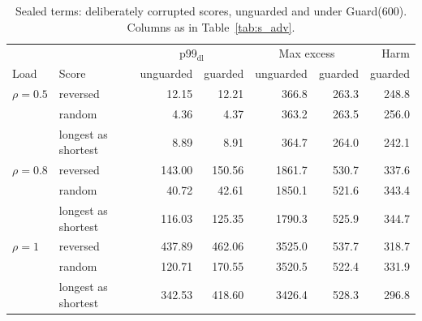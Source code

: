 \documentclass[mathematics,supfile,submit,moreauthors]{Definitions/mdpi}
\newcommand{\sealednum}[1]{#1}
\begin{document}
\begin{table}[htbp]
\centering
\caption{Sealed terms: deliberately corrupted scores, unguarded and under Guard(600). Columns as in Table~\ref{tab:s_adv}.}
\label{tab:adv_sealed}
\small
\setlength{\tabcolsep}{3pt}
\begin{tabular}{llrrrrr}
\toprule
 & & \multicolumn{2}{c}{p99$_{\mathrm{dl}}$} & \multicolumn{2}{c}{Max excess} & Harm \\
Load & Score & unguarded & guarded & unguarded & guarded & guarded \\
\midrule
$\rho = \sealednum{0.5}$ & reversed             & \sealednum{12.15} & \sealednum{12.21} & \sealednum{366.8} & \sealednum{263.3} & \sealednum{248.8} \\
                      & random               & \sealednum{4.36} & \sealednum{4.37} & \sealednum{363.2} & \sealednum{263.5} & \sealednum{256.0} \\
                      & longest as shortest  & \sealednum{8.89} & \sealednum{8.91} & \sealednum{364.7} & \sealednum{264.0} & \sealednum{242.1} \\
$\rho = \sealednum{0.8}$ & reversed             & \sealednum{143.00} & \sealednum{150.56} & \sealednum{1861.7} & \sealednum{530.7} & \sealednum{337.6} \\
                      & random               & \sealednum{40.72} & \sealednum{42.61} & \sealednum{1850.1} & \sealednum{521.6} & \sealednum{343.4} \\
                      & longest as shortest  & \sealednum{116.03} & \sealednum{125.35} & \sealednum{1790.3} & \sealednum{525.9} & \sealednum{344.7} \\
$\rho = \sealednum{1}$ & reversed             & \sealednum{437.89} & \sealednum{462.06} & \sealednum{3525.0} & \sealednum{537.7} & \sealednum{318.7} \\
                      & random               & \sealednum{120.71} & \sealednum{170.55} & \sealednum{3520.5} & \sealednum{522.4} & \sealednum{331.9} \\
                      & longest as shortest  & \sealednum{342.53} & \sealednum{418.60} & \sealednum{3426.4} & \sealednum{528.3} & \sealednum{296.8} \\
\bottomrule
\end{tabular}
\end{table}
\end{document}
